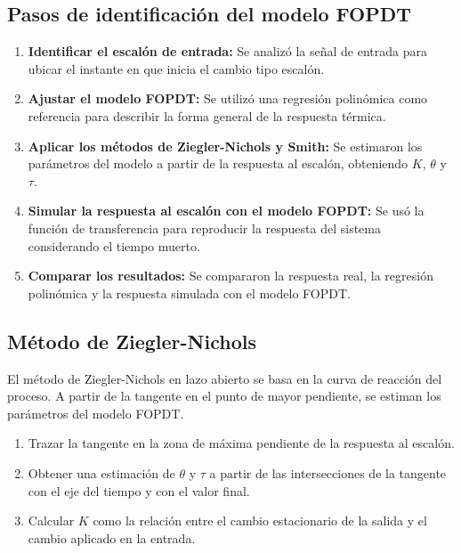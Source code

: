 \documentclass[letterpaper,12pt]{article}
\begin{document}
\subsection*{Pasos de identificación del modelo FOPDT}
\begin{enumerate}
        \item \textbf{Identificar el escalón de entrada:} Se analizó la señal de entrada para ubicar el instante en que inicia el cambio tipo escalón.
            
            \item \textbf{Ajustar el modelo FOPDT:} Se utilizó una regresión polinómica como referencia para describir la forma general de la respuesta térmica.
                
                \item \textbf{Aplicar los métodos de Ziegler-Nichols y Smith:} Se estimaron los parámetros del modelo a partir de la respuesta al escalón, obteniendo \(K\), \(\theta\) y \(\tau\).
                    
                    \item \textbf{Simular la respuesta al escalón con el modelo FOPDT:} Se usó la función de transferencia para reproducir la respuesta del sistema considerando el tiempo muerto.
                        
                        \item \textbf{Comparar los resultados:} Se compararon la respuesta real, la regresión polinómica y la respuesta simulada con el modelo FOPDT.
\end{enumerate}

\subsection*{Método de Ziegler-Nichols}
El método de Ziegler-Nichols en lazo abierto se basa en la curva de reacción del proceso. A partir de la tangente en el punto de mayor pendiente, se estiman los parámetros del modelo FOPDT.

\begin{enumerate}
        \item Trazar la tangente en la zona de máxima pendiente de la respuesta al escalón.
            \item Obtener una estimación de \(\theta\) y \(\tau\) a partir de las intersecciones de la tangente con el eje del tiempo y con el valor final.
                \item Calcular \(K\) como la relación entre el cambio estacionario de la salida y el cambio aplicado en la entrada.
\end{enumerate}
\end{document}
